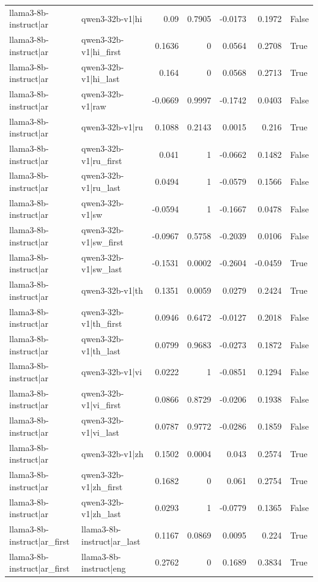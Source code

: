 \begin{table}
\begin{tabular}{l l r r r r l}
llama3-8b-instruct|ar & qwen3-32b-v1|hi & 0.09 & 0.7905 & -0.0173 & 0.1972 & False \\
llama3-8b-instruct|ar & qwen3-32b-v1|hi_first & 0.1636 & 0 & 0.0564 & 0.2708 & True \\
llama3-8b-instruct|ar & qwen3-32b-v1|hi_last & 0.164 & 0 & 0.0568 & 0.2713 & True \\
llama3-8b-instruct|ar & qwen3-32b-v1|raw & -0.0669 & 0.9997 & -0.1742 & 0.0403 & False \\
llama3-8b-instruct|ar & qwen3-32b-v1|ru & 0.1088 & 0.2143 & 0.0015 & 0.216 & True \\
llama3-8b-instruct|ar & qwen3-32b-v1|ru_first & 0.041 & 1 & -0.0662 & 0.1482 & False \\
llama3-8b-instruct|ar & qwen3-32b-v1|ru_last & 0.0494 & 1 & -0.0579 & 0.1566 & False \\
llama3-8b-instruct|ar & qwen3-32b-v1|sw & -0.0594 & 1 & -0.1667 & 0.0478 & False \\
llama3-8b-instruct|ar & qwen3-32b-v1|sw_first & -0.0967 & 0.5758 & -0.2039 & 0.0106 & False \\
llama3-8b-instruct|ar & qwen3-32b-v1|sw_last & -0.1531 & 0.0002 & -0.2604 & -0.0459 & True \\
llama3-8b-instruct|ar & qwen3-32b-v1|th & 0.1351 & 0.0059 & 0.0279 & 0.2424 & True \\
llama3-8b-instruct|ar & qwen3-32b-v1|th_first & 0.0946 & 0.6472 & -0.0127 & 0.2018 & False \\
llama3-8b-instruct|ar & qwen3-32b-v1|th_last & 0.0799 & 0.9683 & -0.0273 & 0.1872 & False \\
llama3-8b-instruct|ar & qwen3-32b-v1|vi & 0.0222 & 1 & -0.0851 & 0.1294 & False \\
llama3-8b-instruct|ar & qwen3-32b-v1|vi_first & 0.0866 & 0.8729 & -0.0206 & 0.1938 & False \\
llama3-8b-instruct|ar & qwen3-32b-v1|vi_last & 0.0787 & 0.9772 & -0.0286 & 0.1859 & False \\
llama3-8b-instruct|ar & qwen3-32b-v1|zh & 0.1502 & 0.0004 & 0.043 & 0.2574 & True \\
llama3-8b-instruct|ar & qwen3-32b-v1|zh_first & 0.1682 & 0 & 0.061 & 0.2754 & True \\
llama3-8b-instruct|ar & qwen3-32b-v1|zh_last & 0.0293 & 1 & -0.0779 & 0.1365 & False \\
llama3-8b-instruct|ar_first & llama3-8b-instruct|ar_last & 0.1167 & 0.0869 & 0.0095 & 0.224 & True \\
llama3-8b-instruct|ar_first & llama3-8b-instruct|eng & 0.2762 & 0 & 0.1689 & 0.3834 & True \\

\end{tabular}
\end{table}
